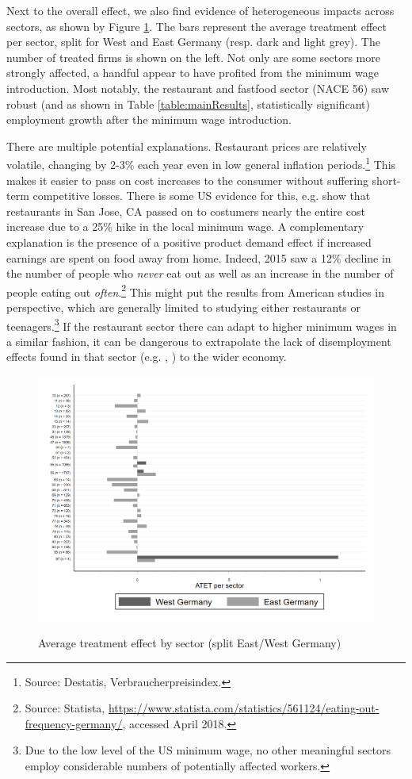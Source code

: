 Next to the overall effect, we also find evidence of heterogeneous impacts across sectors, as shown by Figure \ref{fig:sectorSplit}. The bars represent the average treatment effect per sector, split for West and East Germany (resp. dark and light grey). The number of treated firms is shown on the left. Not only are some sectors more strongly affected, a handful appear to have profited from the minimum wage introduction. Most notably, the restaurant and fastfood sector (NACE 56) saw robust (and as shown in Table \ref{table:mainResults}, statistically significant) employment growth after the minimum wage introduction. 

There are multiple potential explanations. Restaurant prices are relatively volatile, changing by 2-3\% each year even in low general inflation periods.\footnote{Source: Destatis, Verbraucherpreisindex.} This makes it easier to pass on cost increases to the consumer without suffering short-term competitive losses. There is some US evidence for this, e.g. \citet{Allegretto2018} show that restaurants in San Jose, CA passed on to costumers nearly the entire cost increase due to a 25\% hike in the local minimum wage. A complementary explanation is the presence of a positive product demand effect if increased earnings are spent on food away from home. Indeed, 2015 saw a 12\% decline in the number of people who \emph{never} eat out as well as an increase in the number of people eating out \emph{often}.\footnote{Source: Statista, \url{https://www.statista.com/statistics/561124/eating-out-frequency-germany/}, accessed April 2018.} This might put the results from American studies in perspective, which are generally limited to studying either restaurants or teenagers.\footnote{Due to the low level of the US minimum wage, no other meaningful sectors employ considerable numbers of potentially affected workers.} If the restaurant sector there can adapt to higher minimum wages in a similar fashion, it can be dangerous to extrapolate the lack of disemployment effects found in that sector (e.g. \citealp{Dube2010}, \citealp{Allegretto2011}) to the wider economy.

\begin{figure}[htbp]
    \centering
    \caption{Average treatment effect by sector (split East/West Germany)}
    \includegraphics[width=0.70\paperwidth]{Images/ATET_per_sector_graph_ditor.png}
    \label{fig:sectorSplit}
\end{figure}